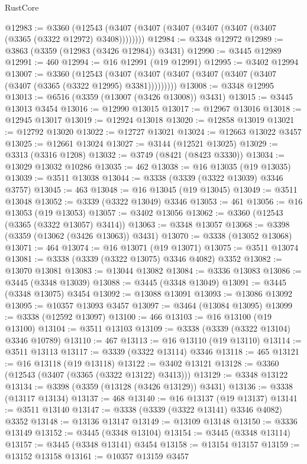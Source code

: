 \begin{lexlean}{RustCore}
\begin{coremodule}
@12983 := @3360
    (@12543 (@3407 (@3407 (@3407 (@3407 (@3407 (@3407 (@3365 (@3322 @12972) @3408))))))))
@12984 := @3348 @12972
@12989 := @3863 (@3359 (@12983 (@3426 @12984)) @3431)
@12990 := @3445 @12989
@12991 := 460
@12994 := @16 @12991 (@19 @12991)
@12995 := @3402 @12994
@13007 := @3360
    (@12543 (@3407 (@3407 (@3407 (@3407 (@3407 (@3407 (@3407 (@3365 (@3322 @12995) @3381)))))))))
@13008 := @3348 @12995
@13013 := @6516 (@3359 (@13007 (@3426 @13008)) @3431)
@13015 := @3445 @13013 @3454
@13016 := @12990 @13015
@13017 := @12967 @13016
@13018 := @12945 @13017
@13019 := @12924 @13018
@13020 := @12858 @13019
@13021 := @12792 @13020
@13022 := @12727 @13021
@13024 := @12663 @13022 @3457
@13025 := @12661 @13024
@13027 := @3144 (@12521 @13025)
@13029 := @3313 (@3316 @1208)
@13032 := @3749 (@8421 (@8423 @3330))
@13034 := @13029 @13032 @10286
@13035 := 462
@13038 := @16 @13035 (@19 @13035)
@13039 := @3511 @13038
@13044 := @3338 (@3339 (@3322 @13039) @3346 @3757)
@13045 := 463
@13048 := @16 @13045 (@19 @13045)
@13049 := @3511 @13048
@13052 := @3339 (@3322 @13049) @3346
@13053 := 461
@13056 := @16 @13053 (@19 @13053)
@13057 := @3402 @13056
@13062 := @3360 (@12543 (@3365 (@3322 @13057) @3414))
@13063 := @3348 @13057
@13068 := @3398 (@3359 (@13062 (@3426 @13063)) @3431)
@13070 := @3338 (@13052 @13068)
@13071 := 464
@13074 := @16 @13071 (@19 @13071)
@13075 := @3511 @13074
@13081 := @3338 (@3339 (@3322 @13075) @3346 @4082) @3352
@13082 := @13070 @13081
@13083 := @13044 @13082
@13084 := @3336 @13083
@13086 := @3445 (@3348 @13039)
@13088 := @3445 (@3348 @13049)
@13091 := @3445 (@3348 @13075) @3454
@13092 := @13088 @13091
@13093 := @13086 @13092
@13095 := @10357 @13093 @3457
@13097 := @3464 (@13084 @13095)
@13099 := @3338 (@12592 @13097)
@13100 := 466
@13103 := @16 @13100 (@19 @13100)
@13104 := @3511 @13103
@13109 := @3338 (@3339 (@3322 @13104) @3346 @10789)
@13110 := 467
@13113 := @16 @13110 (@19 @13110)
@13114 := @3511 @13113
@13117 := @3339 (@3322 @13114) @3346
@13118 := 465
@13121 := @16 @13118 (@19 @13118)
@13122 := @3402 @13121
@13128 := @3360 (@12543 (@3407 (@3365 (@3322 @13122) @3413)))
@13129 := @3348 @13122
@13134 := @3398 (@3359 (@13128 (@3426 @13129)) @3431)
@13136 := @3338 (@13117 @13134)
@13137 := 468
@13140 := @16 @13137 (@19 @13137)
@13141 := @3511 @13140
@13147 := @3338 (@3339 (@3322 @13141) @3346 @4082) @3352
@13148 := @13136 @13147
@13149 := @13109 @13148
@13150 := @3336 @13149
@13152 := @3445 (@3348 @13104)
@13154 := @3445 (@3348 @13114)
@13157 := @3445 (@3348 @13141) @3454
@13158 := @13154 @13157
@13159 := @13152 @13158
@13161 := @10357 @13159 @3457

\end{coremodule}
\end{lexlean}
